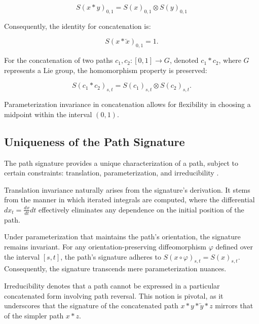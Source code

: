 \begin{equation}
S(x*y)_{0,1} = S(x)_{0,1} \otimes S(y)_{0,1}
\end{equation}

Consequently, the identity for concatenation is:

\begin{equation}
S(x*\overleftarrow{x})_{0,1} = 1.
\end{equation}

For the concatenation of two paths \(c_1, c_2 : [0,1] \rightarrow G\), denoted \(c_1 * c_2\), where \(G\) represents a Lie group, the homomorphism property is preserved:

\begin{equation}
    S(c_1 * c_2)_{s,t} = S(c_1)_{s,t} \otimes S(c_2)_{s,t}.
\end{equation}

Parameterization invariance in concatenation allows for flexibility in choosing a midpoint within the interval \((0,1)\).


\subsection{Uniqueness of the Path Signature}
\label{subsec:uniqueness-signature}

The path signature provides a unique characterization of a path, subject to certain constraints: translation, parameterization, and irreducibility \cite{chenIntegrationPathsFaithful1958}.

Translation invariance naturally arises from the signature's derivation. It stems from the manner in which iterated integrals are computed, where the differential \(dx_t = \frac{dx}{dt}dt\) effectively eliminates any dependence on the initial position of the path.

Under parameterization that maintains the path's orientation, the signature remains invariant. For any orientation-preserving diffeomorphism \(\varphi\) defined over the interval \([s,t]\), the path's signature adheres to \(S(x \circ \varphi)_{s,t} = S(x)_{s,t}\). Consequently, the signature transcends mere parameterization nuances.

Irreducibility denotes that a path cannot be expressed in a particular concatenated form involving path reversal. This notion is pivotal, as it underscores that the signature of the concatenated path \(x*y*\overleftarrow{y}*z\) mirrors that of the simpler path \(x*z\).

